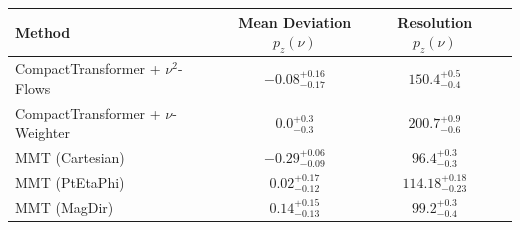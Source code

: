     \begin{tabular}{lccc}
        \toprule
        Method & Mean Deviation $p_{z}(\nu)$ & Resolution $p_{z}(\nu)$ \\
        \midrule
        CompactTransformer + $\nu^2$-Flows & $-0.08^{+0.16}_{-0.17}$ & $150.4^{+0.5}_{-0.4}$ \\
        CompactTransformer + $\nu$-Weighter & $0.0^{+0.3}_{-0.3}$ & $200.7^{+0.9}_{-0.6}$ \\
        MMT (Cartesian) & $-0.29^{+0.06}_{-0.09}$ & $96.4^{+0.3}_{-0.3}$ \\
        MMT (PtEtaPhi) & $0.02^{+0.17}_{-0.12}$ & $114.18^{+0.18}_{-0.23}$ \\
        MMT (MagDir) & $0.14^{+0.15}_{-0.13}$ & $99.2^{+0.3}_{-0.4}$ \\
        \bottomrule
    \end{tabular}